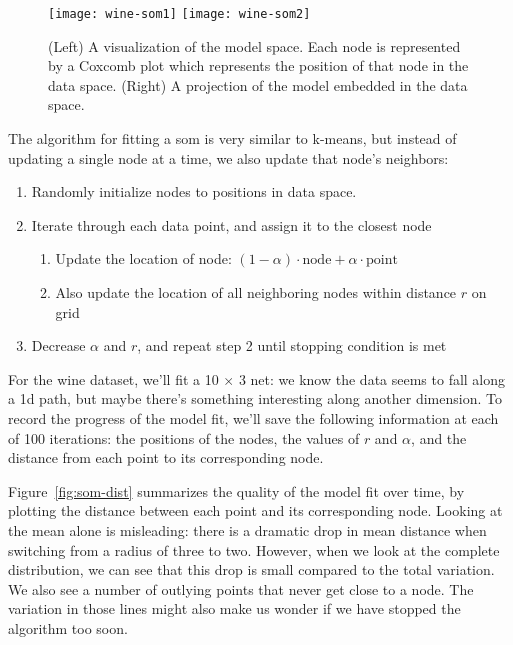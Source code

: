 \documentclass[preprint]{imsart}
\begin{document}
\begin{figure}[htb]
  \centering
    \texttt{[image: wine-som1]}
    \texttt{[image: wine-som2]}
  \caption{(Left) A visualization of the model space.  Each node is represented by a Coxcomb plot which represents the position of that node in the data space. (Right) A projection of the model embedded in the data space. }
  \label{fig:bad-fit}
\end{figure}

The algorithm for fitting a {\sc som} is very similar to k-means, but instead of updating a single node at a time, we also update that node's neighbors:

\begin{enumerate}
  \item Randomly initialize nodes to positions in data space.
  \item Iterate through each data point, and assign it to the closest node
  \begin{enumerate}
    \item Update the location of node: $(1 - \alpha) \cdot \textrm{node} + \alpha \cdot \textrm{point}$
    \item Also update the location of all neighboring nodes within distance $r$ on grid
  \end{enumerate}
  \item Decrease $\alpha$ and $r$, and repeat step 2 until stopping condition is met
\end{enumerate}

For the wine dataset, we'll fit a 10 $\times$ 3 net: we know the data seems to fall along a 1d path, but maybe there's something interesting along another dimension.  To record the progress of the model fit, we'll save the following information at each of 100 iterations: the positions of the nodes, the values of $r$ and $\alpha$, and the distance from each point to its corresponding node.

Figure~\ref{fig:som-dist} summarizes the quality of the model fit over time, by plotting the distance between each point and its corresponding node.  Looking at the mean alone is misleading: there is a dramatic drop in mean distance when switching from a radius of three to two.  However, when we look at the complete distribution, we can see that this drop is small compared to the total variation.  We also see a number of outlying points that never get close to a node.  The variation in those lines might also make us wonder if we have stopped the algorithm too soon.
\end{document}
